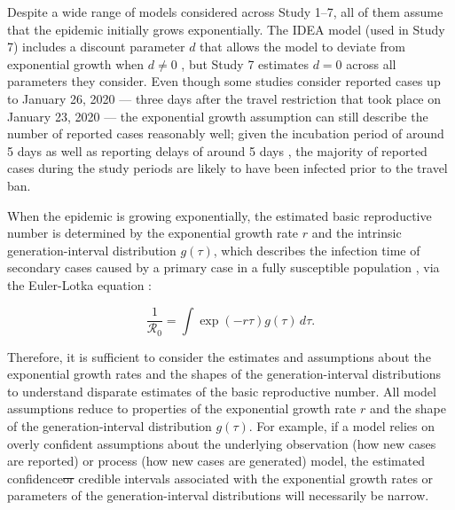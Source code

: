 \documentclass[12pt]{article}
\newcommand{\Ro}{\ensuremath{{\mathcal R}_{0}}\xspace}
\providecommand{\DIFaddtex}[1]{{\protect\color{blue}\uwave{#1}}} %
\providecommand{\DIFdeltex}[1]{{\protect\color{red}\sout{#1}}}                      %
\providecommand{\DIFaddbegin}{} %
\providecommand{\DIFaddend}{} %
\providecommand{\DIFdelbegin}{} %
\providecommand{\DIFdelend}{} %
\providecommand{\DIFadd}[1]{\texorpdfstring{\DIFaddtex{#1}}{#1}} %
\providecommand{\DIFdel}[1]{\texorpdfstring{\DIFdeltex{#1}}{}} %
\newcommand{\DIFscaledelfig}{0.5}
\newlength{\DIFdelgraphicswidth} %
\newlength{\DIFdelgraphicsheight} %
\newcommand{\DIFaddincludegraphics}[2][]{{\color{blue}\fbox{\DIFOincludegraphics[#1]{#2}}}} %
\newcommand{\DIFdelincludegraphics}[2][]{%
\sbox{\DIFdelgraphicsbox}{\DIFOincludegraphics[#1]{#2}}%
\settoboxwidth{\DIFdelgraphicswidth}{\DIFdelgraphicsbox} %
\settoboxtotalheight{\DIFdelgraphicsheight}{\DIFdelgraphicsbox} %
\scalebox{\DIFscaledelfig}{%
\parbox[b]{\DIFdelgraphicswidth}{\usebox{\DIFdelgraphicsbox}\\[-\baselineskip] \rule{\DIFdelgraphicswidth}{0em}}\llap{\resizebox{\DIFdelgraphicswidth}{\DIFdelgraphicsheight}{%
\setlength{\unitlength}{\DIFdelgraphicswidth}%
\begin{picture}(1,1)%
\thicklines\linethickness{2pt} %
{\color[rgb]{1,0,0}\put(0,0){\framebox(1,1){}}}%
{\color[rgb]{1,0,0}\put(0,0){\line( 1,1){1}}}%
{\color[rgb]{1,0,0}\put(0,1){\line(1,-1){1}}}%
\end{picture}%
}\hspace*{3pt}}} %
} %
\DeclareRobustCommand{\DIFaddbegin}{\DIFOaddbegin \let\includegraphics\DIFaddincludegraphics} %
\DeclareRobustCommand{\DIFaddend}{\DIFOaddend \let\includegraphics\DIFOincludegraphics} %
\DeclareRobustCommand{\DIFdelbegin}{\DIFOdelbegin \let\includegraphics\DIFdelincludegraphics} %
\DeclareRobustCommand{\DIFdelend}{\DIFOaddend \let\includegraphics\DIFOincludegraphics} %
\begin{document}
Despite a wide range of models considered across Study 1--7, all of them assume that the epidemic initially grows exponentially.
The IDEA model (used in Study 7) includes a discount parameter $d$ that allows the model to deviate from exponential growth when $d \neq 0$ \citep{fisman2013idea}, but Study 7 estimates $d=0$ across all parameters they consider.
Even though some studies consider reported cases up to January 26, 2020 --- three days after the travel restriction that took place on January 23, 2020 \citep{Tianeabb6105} --- the exponential growth assumption can still describe the number of reported cases reasonably well;
given the incubation period of around 5 days \citep{lauer2020incubation} as well as reporting delays of around 5 days \citep{sun2020early}, the majority of reported cases during the study periods are likely to have been infected prior to the travel ban.

When the epidemic is growing exponentially, the estimated basic reproductive number is determined by the exponential growth rate $r$ and the intrinsic generation-interval distribution $g(\tau)$, which describes the infection time of secondary cases caused by a primary case in a fully susceptible population \citep{champredon2015intrinsic}, via the Euler-Lotka equation \citep{wallinga2007generation}:
\begin{linenomath*}
\begin{equation}
\frac{1}{\Ro} = \int \exp(-r\tau) g(\tau) \, d\tau.
\label{eq:euler}
\end{equation}
\end{linenomath*}
Therefore, it is sufficient to consider the estimates and assumptions about the exponential growth rates and the shapes of the generation-interval distributions to understand disparate estimates of the basic reproductive number.
All model assumptions reduce to properties of the exponential growth rate $r$ and the shape of the generation-interval distribution $g(\tau)$.
For example, if a model relies on overly confident assumptions about the underlying observation (how new cases are reported) or process (how new cases are generated) model, the estimated confidence\DIFdelbegin \DIFdel{or }\DIFdelend \DIFaddbegin \DIFadd{/}\DIFaddend credible intervals  associated with the exponential growth rates or parameters of the generation-interval distributions \DIFaddbegin \DIFadd{(from each study) }\DIFaddend will necessarily be narrow.
\end{document}
